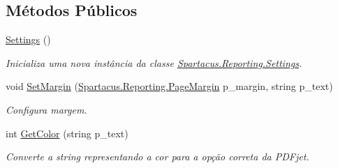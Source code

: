 \subsection*{Métodos Públicos}
\begin{DoxyCompactItemize}
\item 
\hyperlink{classSpartacus_1_1Reporting_1_1Settings_a02176b18d5b39c6c0deed9a06db6d793}{Settings} ()
\begin{DoxyCompactList}\small\item\em Inicializa uma nova instância da classe \hyperlink{classSpartacus_1_1Reporting_1_1Settings}{Spartacus.\+Reporting.\+Settings}. \end{DoxyCompactList}\item 
void \hyperlink{classSpartacus_1_1Reporting_1_1Settings_accc185ddb431534e08d28a6ab97295ce}{Set\+Margin} (\hyperlink{namespaceSpartacus_1_1Reporting_ab924f4d0d38ee1ef2a116121e4ec44fa}{Spartacus.\+Reporting.\+Page\+Margin} p\+\_\+margin, string p\+\_\+text)
\begin{DoxyCompactList}\small\item\em Configura margem. \end{DoxyCompactList}\item 
int \hyperlink{classSpartacus_1_1Reporting_1_1Settings_a35206bd977492579ac555fd43c91635a}{Get\+Color} (string p\+\_\+text)
\begin{DoxyCompactList}\small\item\em Converte a string representando a cor para a opção correta da P\+D\+Fjet. \end{DoxyCompactList}\end{DoxyCompactItemize}

